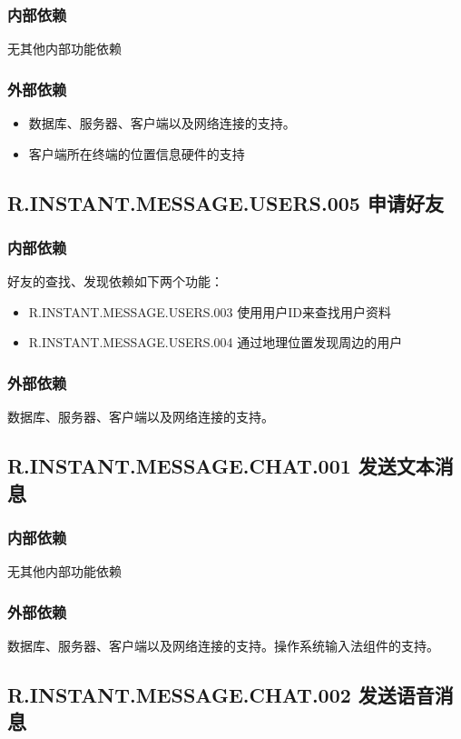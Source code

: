 \subsubsection{内部依赖}
    无其他内部功能依赖
\subsubsection{外部依赖}
\begin{itemize}
    \item 数据库、服务器、客户端以及网络连接的支持。
    \item 客户端所在终端的位置信息硬件的支持
\end{itemize}
\subsection{R.INSTANT.MESSAGE.USERS.005 申请好友}
\subsubsection{内部依赖}
    好友的查找、发现依赖如下两个功能：
    \begin{itemize}
        \item R.INSTANT.MESSAGE.USERS.003 使用用户ID来查找用户资料
        \item R.INSTANT.MESSAGE.USERS.004 通过地理位置发现周边的用户
    \end{itemize}
\subsubsection{外部依赖}
数据库、服务器、客户端以及网络连接的支持。

\subsection{R.INSTANT.MESSAGE.CHAT.001 发送文本消息}
\subsubsection{内部依赖}
    无其他内部功能依赖
\subsubsection{外部依赖}
    数据库、服务器、客户端以及网络连接的支持。操作系统输入法组件的支持。

	
\subsection{R.INSTANT.MESSAGE.CHAT.002 发送语音消息}
